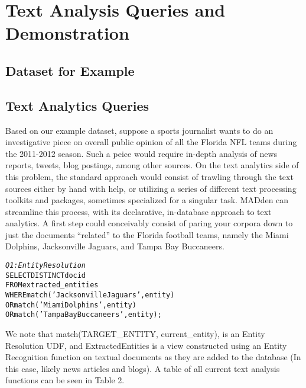 \section{Text Analysis Queries and Demonstration}
\subsection{Dataset for Example}

\subsection{Text Analytics Queries}
Based on our example dataset, suppose a sports journalist
wants to do an investigative piece on overall public opinion 
of all the Florida NFL teams during the 2011-2012 season. 
Such a peice would require in-depth analysis of news reports,
tweets, blog postings, among other sources. On the text
analytics side of this problem, the standard approach would
consist of trawling through the text sources either by hand
with help, or utilizing a series of different text processing
toolkits and packages, sometimes specialized for a singular 
task. MADden can streamline this process, with its declarative,
in-database approach to text analytics. A first step could 
conceivably consist of paring your corpora down to just
the documents ``related'' to the Florida football teams, namely
the Miami Dolphins, Jacksonville Jaguars, and Tampa Bay Buccaneers. 

\begin{small}
\begin{alltt}
\textit{Q1: Entity Resolution}
SELECT DISTINCT docid
FROM extracted_entities
WHERE match('Jacksonville Jaguars', entity)
   OR match('Miami Dolphins', entity)
   OR match('Tampa Bay Buccaneers', entity);
\end{alltt}
\end{small}


We note that match(TARGET_ENTITY, current_entity), is an Entity
Resolution UDF, and ExtractedEntities is a view constructed 
using an Entity Recognition function on textual documents as they
are added to the database (In this case, likely news articles and blogs). A
table of all current text analysis functions can be seen in Table 2.\\

